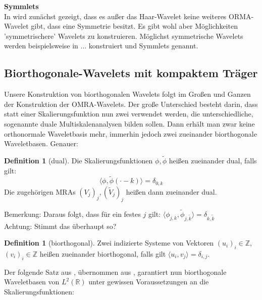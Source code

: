 \documentclass[11pt,a4paper,titlepage]{article}
\theoremstyle{plain} %
\newcommand{\skalar}[2]{\langle #1, #2\rangle}
\theoremstyle{definition} %
\newtheorem{definition}[satz]{Definition}
\numberwithin{equation}{section} %
\begin{document}
		\textbf{Symmlets}\\
		In \cite{Daubechies1990} wird zunächst gezeigt, dass es außer das Haar-Wavelet keine weiteres ORMA-Wavelet gibt, dass eine Symmetrie besitzt. Es gibt wohl aber Möglichkeiten 'symmetrischere' Wavelets zu konstruieren. Möglichst symmetrische Wavelets werden beispielsweise in ... konstruiert und Symmlets genannt.
		
		\subsection{Biorthogonale-Wavelets mit kompaktem Träger}
		\label{BiOMRA}
		Unsere Konstruktion von biorthogonalen Wavelets folgt im Großen und Ganzen der Konstruktion der OMRA-Wavelets. Der große Unterschied besteht darin, dass statt einer Skalierungsfunktion nun zwei verwendet werden, die unterschiedliche, sogenannte duale Multiskalenanalysen bilden sollen. Dann erhält man zwar keine orthonormale Waveletbasis mehr, immerhin jedoch zwei zueinander biorthogonale Waveletbasen. Genauer:
		
		\begin{definition} [dual]
			Die Skalierungsfunktionen $\phi, \tilde{\phi}$ heißen zueinander dual, falls gilt: 
			\begin{equation}
				\skalar{\phi}{\tilde{\phi}(\cdot - k)}=\delta_{0,k}
			\end{equation} 
			Die zugehörigen MRAs $(V_j)_j, (\tilde{V}_j)_j$ heißen dann zueinander dual.
		\end{definition} 
		
		Bemerkung: Daraus folgt, dass für ein festes $j$ gilt: $\skalar{\phi_{j,k}}{\tilde{\phi}_{j,\tilde{k}}}=\delta_{k,\tilde{k}}$\\
		Achtung: Stimmt das überhaupt so?
		
		\begin{definition}[biorthogonal]
			Zwei indizierte Systeme von Vektoren $(u_i)_i\in \mathbb{Z}$, $(v_i)_i\in \mathbb{Z}$ heißen zueinander biorthogonal, falls gilt $\skalar{u_i}{v_j}=\delta_{i,j}$.
		\end{definition}
		
		Der folgende Satz aus \cite{CohenDaubechiesFeauveau}, übernommen aus \cite{Primbs2006}, garantiert nun biorthogonale Waveletbasen von $L^2(\mathbb{R})$ unter gewissen Voraussetzungen an die Skalierungsfunktionen:
		
\end{document}
